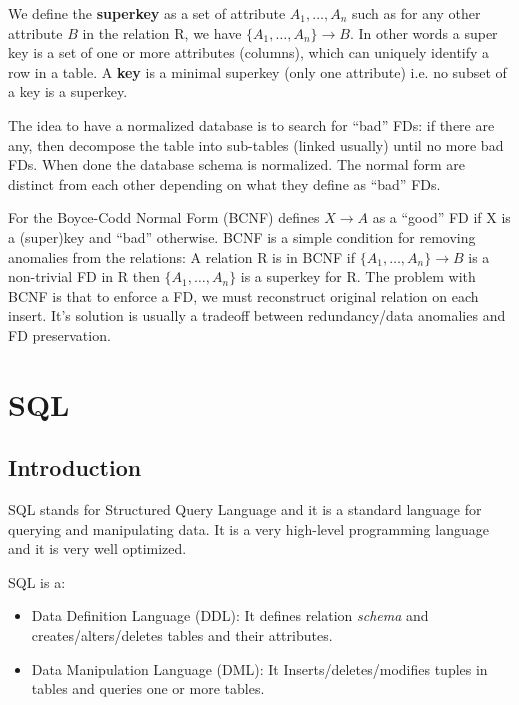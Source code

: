\documentclass[a4page, 11pt]{article}
\begin{document}
We define the \textbf{superkey} as a set of attribute $A_1,\hdots, A_n$ such as for any other attribute $B$ in the relation R, we have $\{A_1,\hdots,A_n\} \rightarrow B$. In other words a super key is a set of one or more attributes (columns), which can uniquely identify a row in a table.
A \textbf{key} is a minimal superkey (only one attribute) i.e. no subset of a key is a superkey.

The idea to have a normalized database is to search for ``bad'' FDs: if there are any, then decompose the table into sub-tables (linked usually) until no more bad FDs. When done the database schema is normalized. 
The normal form are distinct from each other depending on what they define as ``bad'' FDs.

For the Boyce-Codd Normal Form (BCNF) defines $X \rightarrow A$ as a ``good'' FD if X is a (super)key and ``bad'' otherwise. 
BCNF is a simple condition for removing anomalies from the relations: A relation R is in BCNF if $\{A_1,\hdots,A_n\} \rightarrow B$ is a non-trivial FD in R then $\{A_1,\hdots,A_n\}$ is a superkey for R.\newline
The problem with BCNF is that to enforce a FD, we must reconstruct original relation on each insert. It's solution is usually a tradeoff between redundancy/data anomalies and FD preservation.

\section{SQL}
\subsection{Introduction}
SQL stands for Structured Query Language and it is a standard language for querying and manipulating data. It is a very high-level programming language and it is very well optimized.


SQL is a:
\begin{itemize}[noitemsep]
	\item Data Definition Language (DDL):\newline
	 It defines relation \textit{schema} and creates/alters/deletes tables and their attributes.
	\item Data Manipulation Language (DML):\newline
	It Inserts/deletes/modifies tuples in tables and queries one or more tables.
\end{itemize}
\end{document}
